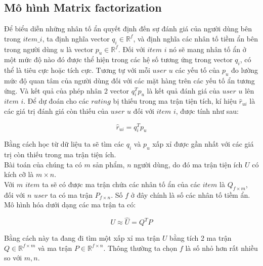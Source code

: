 \subsection{Mô hình Matrix factorization}
Để biểu diễn những nhân tố ẩn quyết định đến sự đánh giá của người dùng bên trong $item\_i$, ta định nghĩa vector $q_i \in \mathbb{R}^f$, và định nghĩa các nhân tố tiềm ẩn bên trong người dùng $u$ là vector $p_u \in \mathbb{R}^f$.
Đối với $item$ $i$ nó sẽ mang nhân tố ẩn ở một mức độ nào đó được thể hiện trong các hệ số tương ứng trong vector $q_i$, có thể là tiêu cực hoặc tích cực. Tương tự với mỗi $user$ $u$ các yếu tố của $p_u$ đo lường mức độ quan tâm của người dùng đối với các mặt hàng trên các yếu tố ẩn tương ứng. Và kết quả của phép nhân 2 vector $q_i ^T p_u$ là kết quả đánh giá của $user$ $u$ lên $item$ $i$. Để dự đoán cho các $rating$ bị thiếu trong ma trận tiện tích, kí hiệu  $\hat r_{ui}$ là các giá trị đánh giá còn thiếu của $user$ $u$ đối với $item$ $i$, được tính như sau:
\begin{center}
    \begin{equation}
        \hat r_{ui} = q_i ^T p_u
    \end{equation}
\end{center}
Bằng cách học từ dữ liệu ta sẽ tìm các $q_i$ và $p_u$ xấp xỉ được gần nhất với các giá trị còn thiếu trong ma trận tiện ích.\\
Bài toán của chúng ta có $m$ sản phẩm, $n$  người dùng, do đó ma trận tiện ích $U$ có kích cỡ là $m \times n$.\\ 
Với $m$ $item$ ta sẽ có được ma trận chứa các nhân tố ẩn của các $item$ là $Q_{f \times m}$, đối với $n$ $user$ ta có ma trận $P_{f\times n}$. Số $f$ ở đây chính là số các nhân tố tiềm ẩn.\\
Mô hình hóa dưới dạng các ma trận ta có:
\begin{center}
    \begin{equation}
        U \approx \hat U = Q^TP
    \end{equation}
\end{center}
Bằng cách này ta đang đi tìm một xấp xỉ ma trận $U$ bằng tích 2 ma trận $Q \in \mathbb{R}^{f \times m}$ và ma trận $P \in \mathbb{R}^{f \times n}$. Thông thường ta chọn $f$ là số nhỏ hơn rất nhiều so với $m,n$.
